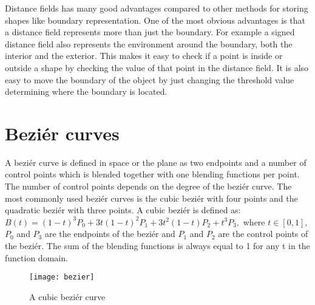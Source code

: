 Distance fields has many good advantages compared to other methods for storing shapes like boundary representation. One of the most obvious advantages is that a distance field represents more than just the boundary. For example a signed distance field also represents the environment around the boundary, both the interior and the exterior. This makes it easy to check if a point is inside or outside a shape by checking the value of that point in the distance field. It is also easy to move the boundary of the object by just changing the threshold value determining where the boundary is located. \citep{Jones2006}

\section{Beziér curves}\label{bezier}
A beziér curve is defined in space or the plane as two endpoints and a number of control points which is blended together with one blending functions per point. The number of control points depends on the degree of the beziér curve. The most commonly used beziér curves is the cubic beziér with four points and the quadratic beziér with three points. A cubic beziér is defined as:\vspace{\baselineskip}\newline
\begin{math}
	B(t) = (1 - t)^3P_0 + 3t(1 - t)^2P_1 + 3t^2(1 - t)P_2 + t^3P_3, 
\end{math} \vspace{\baselineskip}\newline
where \begin{math}t\in[0, 1], \end{math} \begin{math}P_0\end{math} and \begin{math}P_3\end{math} are the endpoints of the beziér and \begin{math}P_1\end{math} and \begin{math}P_2\end{math} are the control points of the beziér. The sum of the blending functions is always equal to 1 for any t in the function domain.\citep{PFNP}

\begin{figure}[H]
\texttt{[image: bezier]}
\caption{A cubic beziér curve}
\end{figure}

